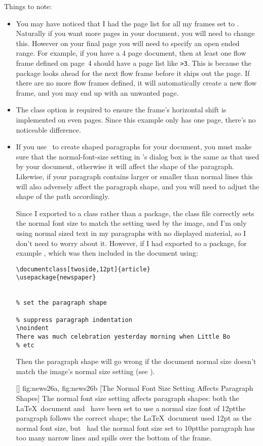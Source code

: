 Things to note:
\begin{itemize}
\item You may have noticed that I had the page list for all my frames
set to . Naturally if you
want more pages in your document, you will need to change this.
However on your final page you will need to specify an open ended
range. For example, if you have a 4 page document, then at least
one flow frame defined on page~4 should have a page list like
\verb|>3|. This is because the  package looks ahead
for the next flow frame before it ships out the page. If there are
no more flow frames defined, it will automatically create a new
flow frame, and you may end up with an unwanted page.

\item The  class option is required to ensure the
 frame's horizontal shift is implemented on even pages.
Since this example only has one page, there's no noticeable
difference.

\item If you use \FlowframTk\ to create shaped paragraphs for your
document, you must make sure that the \gls{normal-font-size} setting
in \FlowframTk's  dialog box is the same as that
used by your document, otherwise it will affect the shape of the
paragraph.  Likewise, if your paragraph contains larger or smaller
than normal lines this will also adversely affect the paragraph
shape, and you will need to adjust the shape of the \gls{path}
accordingly.

Since I exported to a class rather than a package, the class file
correctly sets the normal font size to match the setting used by the
image, and I'm only using normal sized text in my paragraphs with no
displayed material, so I don't need to worry about it. However, if I
had exported to a package, for example , which was then
included in the document using:
\begin{verbatim}
\documentclass[twoside,12pt]{article}
\usepackage{newspaper}


% set the paragraph shape

% suppress paragraph indentation
\noindent
There was much celebration yesterday morning when Little Bo
% etc
\end{verbatim}
Then the paragraph shape will go wrong if the document normal size
doesn't match the image's normal size setting (see
).

[]
{
  {fig:news26a}{}{},
  {fig:news26b}{}{}
}
[The Normal Font Size Setting Affects Paragraph Shapes]
{The normal font size setting affects paragraph shapes:
 both the \LaTeX\ document and \FlowframTk\ have been
set to use a normal size font of 12pt\dash the paragraph follows the
correct shape;
 the \LaTeX\ document used 12pt as
the normal font size, but \FlowframTk\ had the normal font size set
to 10pt\dash the paragraph has too many narrow lines and spills over
the bottom of the frame.}

\end{itemize}

